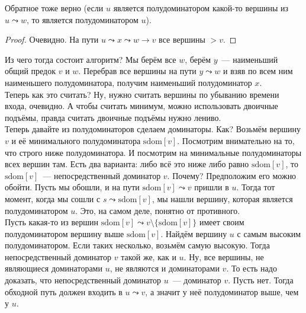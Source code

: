\documentclass{article}
\begin{document}
    \begin{claim}
        Обратное тоже верно (если $u$ является полудоминатором какой-то вершины из $u\leadsto w$, то является полудоминатором $u$).
    \end{claim}
    \begin{proof}
        Очевидно. На пути $u\leadsto x\leadsto w\to v$ все вершины $>v$.
    \end{proof}\noindent
    Из чего тогда состоит алгоритм? Мы берём все $w$, берём $y$~--- наименьший общий предок $v$ и $w$. Перебрав все вершины на пути $y\leadsto w$ и взяв по всем ним наименьшего полудоминатора, получим наименьший полудоминатор $x$.\\
    Теперь как это считать? Ну, нужно считать вершины по убыванию времени входа, очевидно. А чтобы считать минимум, можно использовать двоичные подъёмы, правда считать двоичные подъёмы нужно лениво.\\
    Теперь давайте из полудоминаторов сделаем доминаторы. Как? Возьмём вершину $v$ и её минимального полудоминатора $\mathrm{sdom}[v]$. Посмотрим внимательно на то, что строго ниже полудоминатора. И посмотрим на минимальные полудоминаторы всех вершин там. Есть два варианта: либо всё это ниже либо равно $\mathrm{sdom}[v]$, то $\mathrm{sdom}[v]$~--- непосредственный доминатор $v$. Почему? Предположим его можно обойти. Пусть мы обошли, и на пути $\mathrm{sdom}[v]\leadsto v$ пришли в $u$. Тогда тот момент, когда мы сошли с $s\leadsto\mathrm{sdom}[v]$, мы нашли вершину, которая является полудоминатором $u$. Это, на самом деле, понятно от противного.\\
    Пусть какая-то из вершин $\mathrm{sdom}[v]\leadsto v\setminus\{\mathrm{sdom}[v]\}$ имеет своим полудоминатором вершину выше $\mathrm{sdom}[v]$. Найдём вершину $u$ с самым высоким полудоминатором. Если таких несколько, возьмём самую высокую. Тогда непосредственный доминатор $v$ такой же, как и $u$. Ну, все вершины, не являющиеся доминаторами $u$, не являются и доминаторами $v$. То есть надо доказать, что непосредственный доминатор $u$~--- доминатор $v$. Пусть нет. Тогда обходной путь должен входить в $u\leadsto v$, а значит у неё полудоминатор выше, чем у $u$.
    
\end{document}
